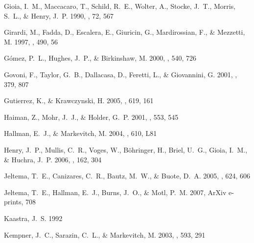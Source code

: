 \documentclass[12pt,preprint]{aastex}
\begin{document}
\begin{thebibliography}{83}
{Gioia}, I.~M., {Maccacaro}, T., {Schild}, R.~E., {Wolter}, A., {Stocke},
  J.~T., {Morris}, S.~L., \& {Henry}, J.~P. 1990, \apjs, 72, 567

{Girardi}, M., {Fadda}, D., {Escalera}, E., {Giuricin}, G., {Mardirossian}, F.,
  \& {Mezzetti}, M. 1997, \apj, 490, 56

{G{\'o}mez}, P.~L., {Hughes}, J.~P., \& {Birkinshaw}, M. 2000, \apj, 540, 726

{Govoni}, F., {Taylor}, G.~B., {Dallacasa}, D., {Feretti}, L., \& {Giovannini},
  G. 2001, \aap, 379, 807

{Gutierrez}, K., \& {Krawczynski}, H. 2005, \apj, 619, 161

{Haiman}, Z., {Mohr}, J.~J., \& {Holder}, G.~P. 2001, \apj, 553, 545

{Hallman}, E.~J., \& {Markevitch}, M. 2004, \apjl, 610, L81

{Henry}, J.~P., {Mullis}, C.~R., {Voges}, W., {B{\"o}hringer}, H., {Briel},
  U.~G., {Gioia}, I.~M., \& {Huchra}, J.~P. 2006, \apjs, 162, 304

{Jeltema}, T.~E., {Canizares}, C.~R., {Bautz}, M.~W., \& {Buote}, D.~A. 2005,
  \apj, 624, 606

{Jeltema}, T.~E., {Hallman}, E.~J., {Burns}, J.~O., \& {Motl}, P.~M. 2007,
  ArXiv e-prints, 708

{Kaastra}, J.~S. 1992

{Kempner}, J.~C., {Sarazin}, C.~L., \& {Markevitch}, M. 2003, \apj, 593, 291


\end{thebibliography}
\end{document}
